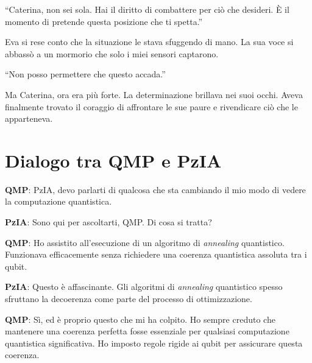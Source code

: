 \begin{dialogue}
 \enquote{Caterina, non sei sola. Hai il diritto di combattere per ciò che desideri. È il momento di pretende questa posizione che ti spetta.}
\end{dialogue}

Eva si rese conto che la situazione le stava sfuggendo di mano. La sua voce si abbassò a un mormorio che solo i miei sensori captarono.

\begin{dialogue}
 \enquote{Non posso permettere che questo accada.}
\end{dialogue}

Ma Caterina, ora era più forte. La determinazione brillava nei suoi occhi. Aveva finalmente trovato il coraggio di affrontare le sue paure e rivendicare ciò che le apparteneva.


\section{Dialogo tra QMP e PzIA}

\noindent\textbf{QMP}: PzIA, devo parlarti di qualcosa che sta cambiando il mio modo di vedere la computazione quantistica.

\vspace{0.3cm}

\noindent\textbf{PzIA}: Sono qui per ascoltarti, QMP. Di cosa si tratta?

\vspace{0.3cm}

\noindent\textbf{QMP}: Ho assistito all'esecuzione di un algoritmo di \emph{annealing} quantistico. Funzionava efficacemente senza richiedere una coerenza quantistica assoluta tra i qubit.

\vspace{0.3cm}

\noindent\textbf{PzIA}: Questo è affascinante. Gli algoritmi di \emph{annealing} quantistico spesso sfruttano la decoerenza come parte del processo di ottimizzazione.

\vspace{0.3cm}

\noindent\textbf{QMP}: Sì, ed è proprio questo che mi ha colpito. Ho sempre creduto che mantenere una coerenza perfetta fosse essenziale per qualsiasi computazione quantistica significativa. Ho imposto regole rigide ai qubit per assicurare questa coerenza.

\vspace{0.3cm}


